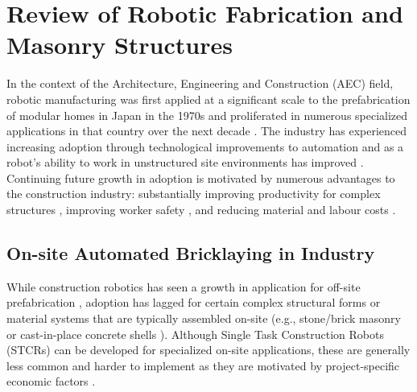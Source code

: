 \section{Review of Robotic Fabrication and Masonry Structures}\label{sec:2_lit_review}
In the context of the Architecture, Engineering and Construction (AEC) field, robotic manufacturing was first applied at a significant scale to the prefabrication of modular homes in Japan in the 1970s \cite{bock_construction_2007, bock_future_2015} and proliferated in numerous specialized applications in that country over the next decade \cite{albus_trip_1986, cousineau_construction_1998, huang_factor_1990, ueno_construction_1986}. The industry has experienced increasing adoption through technological improvements to automation and as a robot's ability to work in unstructured site environments has improved \cite{bock_site_2016, skibniewski_robotics_1989}. Continuing future growth in adoption is motivated by numerous advantages to the construction industry: substantially improving productivity for complex structures  \cite{davila_delgado_robotics_2019}, improving worker safety \cite{castro-lacouture_construction_2009}, and reducing material and labour costs \cite{garcia_de_soto_productivity_2018, kumar_robotics_2016}.

\subsection{On-site Automated Bricklaying in Industry}\label{sec:2_automated_brick}
While construction robotics has seen a growth in application for off-site prefabrication \cite{bock_robotic_2015}, adoption has lagged for certain complex structural forms or material systems that are typically assembled on-site (e.g., stone/brick masonry \cite{block_structural_2018, rippmann_computational_2016, davis_innovative_2012, borne_droneport_2016} or cast-in-place concrete shells \cite{chilton_heinz_2010, chilton_rooted_2017}). Although Single Task Construction Robots (STCRs) \cite{bock_construction_2016} can be developed for specialized on-site applications, these are generally less common and harder to implement as they are motivated by project-specific economic factors \cite{bock_site_2016}.

